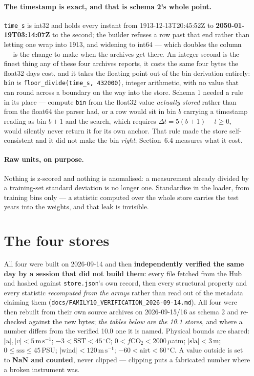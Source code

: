 \documentclass[10pt]{article}
\newcommand{\code}[1]{\texttt{#1}}
\begin{document}
\paragraph{The timestamp is exact, and that is schema 2's whole point.}
\code{time\_s} is int32 and holds every instant from 1913-12-13T20:45:52Z to
\textbf{2050-01-19T03:14:07Z} to the second; the builder refuses a row past that
end rather than letting one wrap into 1913, and widening to int64 --- which
doubles the column --- is the change to make when the archives get there. An
integer second is the finest thing any of these four archives reports, it costs
the same four bytes the float32 days cost, and it takes the floating point out
of the bin derivation entirely: \code{bin} is
\code{floor\_divide(time\_s, 432000)}, integer arithmetic, with no value that
can round across a boundary on the way into the store. Schema 1 needed a rule
in its place --- compute \code{bin} from the float32 value \emph{actually
stored} rather than from the float64 the parser had, or a row would sit in bin
$b$ carrying a timestamp reading as bin $b+1$ and the search, which requires
$\Delta t = 5(b+1) - t \ge 0$, would silently never return it for its own
anchor. That rule made the store self-consistent and it did not make the bin
\emph{right}; Section~6.4 measures what it cost.

\paragraph{Raw units, on purpose.} Nothing is z-scored and nothing is
anomalised: a measurement already divided by a training-set standard deviation
is no longer one. Standardise in the loader, from training bins only --- a
statistic computed over the whole store carries the test years into the weights,
and that leak is invisible.

\section{The four stores}

All four were built on 2026-09-14 and then \textbf{independently verified the
same day by a session that did not build them}: every file fetched from the Hub
and hashed against \code{store.json}'s own record, then every structural
property and every statistic \emph{recomputed from the arrays} rather than read
out of the metadata claiming them
(\code{docs/FAMILY10\_VERIFICATION\_2026-09-14.md}). All four were then rebuilt
from their own source archives on 2026-09-15/16 as schema 2 and re-checked
against the new bytes; \emph{the tables below are the 10.1 stores}, and where a
number differs from the verified 10.0 one it is named. Physical bounds are
shared:
$|u|, |v| < 5\,\mathrm{m\,s^{-1}}$; $-3 < \mathrm{SST} < 45\,^\circ$C;
$0 < f\mathrm{CO_2} < 2000\,\mu$atm; $|\mathrm{sla}| < 3$\,m;
$0 \le \mathrm{sss} \le 45$\,PSU; $|\mathrm{wind}| < 120\,\mathrm{m\,s^{-1}}$;
$-60 < \mathrm{airt} < 60\,^\circ$C. A value outside is set to \textbf{NaN and
counted}, never clipped --- clipping puts a fabricated number where a broken
instrument was.
\end{document}
